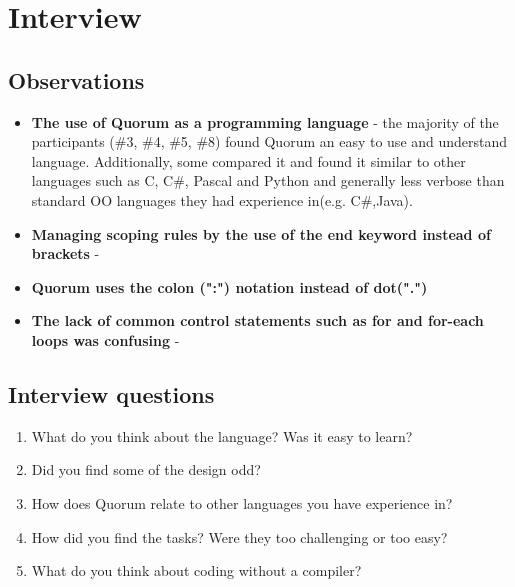 \section{Interview}

\subsection{Observations}
\begin{itemize}
\item \textbf{The use of Quorum as a programming language} - the majority of the participants (\#3, \#4, \#5, \#8) found Quorum an easy to use and understand language. Additionally, some compared it and found it similar to other languages such as C, C\#, Pascal and Python and generally less verbose than standard OO languages they had experience in(e.g. C\#,Java). 
\item \textbf{Managing scoping rules by the use of the end keyword instead of brackets} - 
\item \textbf{Quorum uses the colon (":") notation instead of dot(".")}
\item \textbf{The lack of common control statements such as for and for-each loops was confusing} - 
\end{itemize}


\subsection{Interview questions}
\begin{enumerate}
\item What do you think about the language? Was it easy to learn?
\item Did you find some of the design odd?
\item How does Quorum relate to other languages you have experience in?
\item How did you find the tasks? Were they too challenging or too easy?
\item What do you think about coding without a compiler?
\end{enumerate}	